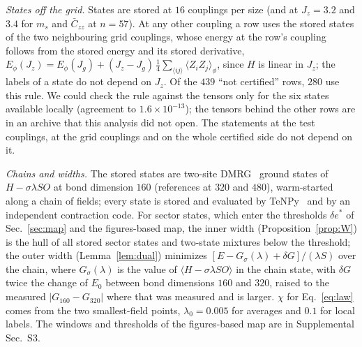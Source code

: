 \documentclass[aps,prx,twocolumn,10pt,superscriptaddress,nofootinbib,longbibliography,floatfix]{revtex4-2}
\theoremstyle{remark}
\newcommand{\Jz}{J_z}
\newcommand{\ms}{m_s}
\newcommand{\Czz}{\bar C_{zz}}
\newcommand{\des}{\delta e^{*}}
\begin{document}
\emph{States off the grid.} States are stored at $16$ couplings per size (and at $\Jz=3.2$ and $3.4$ for $\ms$ and %
$\Czz$ at $n=57$). At any other coupling a row uses the stored states of the two neighbouring grid couplings, whose
energy at the row's coupling follows from the stored energy and its stored derivative,
$E_\phi(\Jz)=E_\phi(J_g)+(\Jz-J_g)\,\frac14\sum_{\langle ij\rangle}\langle Z_iZ_j\rangle_\phi$, since $H$ is linear in
$\Jz$; the labels of a state do not depend on $\Jz$. Of the $439$ ``not certified'' rows, $280$ use this rule. %
We could check the rule against the tensors only for the six
states available locally (agreement to $1.6\times10^{-13}$); the tensors behind the other rows are in an archive %
that this analysis did not open. The statements at the test couplings, at the grid couplings and on the whole
certified side do not depend on it.

\emph{Chains and widths.} The stored states are two-site DMRG~\cite{white1992,schollwock2011} ground states of
$H-\sigma\lambda SO$ at bond dimension $160$ (references at $320$ and $480$), warm-started along a chain of fields; %
every state is stored and evaluated by TeNPy~\cite{hauschild2018,hauschild2024} and by an independent contraction
code. For sector states, which enter the thresholds $\des$ of Sec.~\ref{sec:map} and the figures-based
map, the inner width (Proposition~\ref{prop:W}) is the hull of all stored sector states and two-state mixtures below
the threshold; the outer width (Lemma~\ref{lem:dual}) minimizes $[E-G_\sigma(\lambda)+\delta G]/(\lambda S)$ over
the chain, where $G_\sigma(\lambda)$ is the value of $\langle H-\sigma\lambda SO\rangle$ in the chain state, with $\delta G$ twice the change of $E_0$
between bond dimensions $160$ and $320$, raised to the measured $|G_{160}-G_{320}|$ where that was measured and is %
larger. $\chi$ for Eq.~\eqref{eq:law} comes from the two smallest-field points, $\lambda_0=0.005$ for averages and %
$0.1$ for local labels. The windows and thresholds of the figures-based map are in Supplemental Sec.~S3. %
\end{document}
